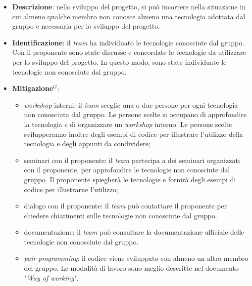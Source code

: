 \label{risk:conoscenza tecnologie carente}
\begin{itemize}
	\item \textbf{Descrizione}:
	      nello sviluppo del progetto, si può incorrere nella situazione in cui
	      almeno qualche membro non conosce almeno una tecnologia adottata dal
	      gruppo e necessaria per lo sviluppo del progetto.

	\item \textbf{Identificazione}: il \textit{team} ha individuato le
	      tecnologie conosciute dal gruppo. Con il proponente sono state
	      discusse e concordate le tecnologie da utilizzare per lo sviluppo del
	      progetto. In questo modo, sono state individuate le tecnologie
	      non conosciute dal gruppo.

	\item \textbf{\gls{Mitigazione}$^G$}:
	      \begin{itemize}
		      \item \textit{workshop} interni: il \textit{team} sceglie
		            una o due persone per ogni tecnologia non conosciuta dal
		            gruppo. Le persone scelte si occupano di approfondire la
		            tecnologia e di organizzare un \textit{workshop} interno.
		            Le persone scelte svilupperanno inoltre degli esempi di
		            codice per illustrare l'utilizzo della tecnologia e degli
		            appunti da condividere;

		      \item seminari con il proponente: il \textit{team} partecipa a
		            dei seminari organizzati con il proponente, per approfondire
		            le tecnologie non conosciute dal gruppo. Il proponente
		            spiegherà le tecnologie e fornirà degli esempi di codice
		            per illustrarne l'utilizzo;

		      \item dialogo con il proponente: il \textit{team} può
		            contattare il proponente per chiedere chiarimenti sulle
		            tecnologie non conosciute dal gruppo.

		      \item documentazione: il \textit{team} può consultare la
		            documentazione ufficiale delle tecnologie non conosciute
		            dal gruppo.

		      \item \textit{pair programming}: il codice viene sviluppato con
		            almeno un altro membro del gruppo. Le modalità di lavoro
		            sono meglio descritte nel documento "\textit{Way of
			            working}".


\end{itemize}
\end{itemize}
